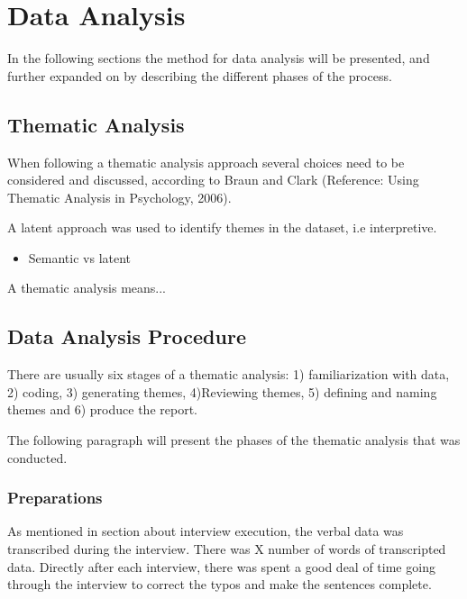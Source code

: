 \section{Data Analysis}
In the following sections the method for data analysis will be presented, and further expanded on by describing the different phases of the process.  
    \subsection{Thematic Analysis}
    When following a thematic analysis approach several choices need to be considered and discussed, according to Braun and Clark (Reference: Using Thematic Analysis in Psychology, 2006). 
    
    A latent approach was used to identify themes in the dataset, i.e interpretive.  
    
\begin{itemize}
\item     Semantic vs latent
\end{itemize}
    A thematic analysis means... 
    
    \subsection{Data Analysis Procedure}
    There are usually six stages of a thematic analysis: 1) familiarization with data, 2) coding, 3) generating themes, 4)Reviewing themes, 5) defining and naming themes and 6) produce the report.
    
    The following paragraph will present the phases of the thematic analysis that was conducted. 
    
    \subsubsection{Preparations}
    As mentioned in section about interview execution, the verbal data was transcribed during the interview. There was X number of words of transcripted data. 
    Directly after each interview, there was spent a good deal of time going through the interview to correct the typos and make the sentences complete. 

